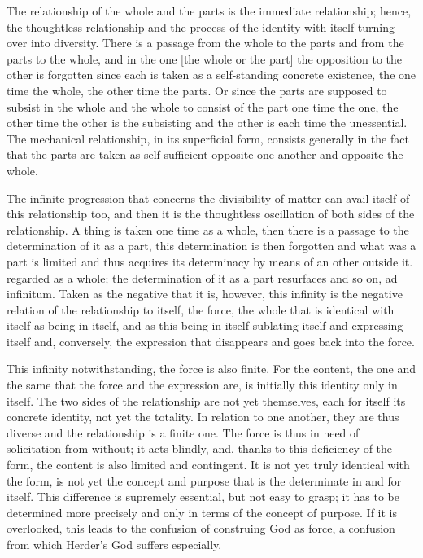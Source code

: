     The relationship of the whole and the parts is
    the immediate relationship;
    hence, the thoughtless relationship
    and the process of the identity-with-itself
    turning over into diversity.
    There is a passage from the whole to the parts and
    from the parts to the whole,
    and in the one [the whole or the part]
    the opposition to the other is forgotten since
    each is taken as a self-standing concrete existence,
    the one time the whole, the other time the parts.
    Or since the parts are supposed to subsist in the whole
    and the whole to consist of the part one time the one,
    the other time the other is the subsisting and
    the other is each time the unessential.
    The mechanical relationship,
    in its superficial form,
    consists generally in the fact
    that the parts are taken as self-sufficient
    opposite one another and opposite the whole.

    The infinite progression that concerns
    the divisibility of matter
    can avail itself of this relationship too,
    and then it is the thoughtless oscillation
    of both sides of the relationship.
    A thing is taken one time as a whole,
    then there is a passage to the determination of it as a part,
    this determination is then forgotten and
    what was a part is limited and thus acquires its determinacy
    by means of an other outside it.
    regarded as a whole;
    the determination of it as a part resurfaces and so on,
    ad infinitum.
    Taken as the negative that it is, however,
    this infinity is the negative relation of
    the relationship to itself, the force,
    the whole that is identical with itself as being-in-itself,
    and as this being-in-itself sublating itself and expressing itself
    and, conversely, the expression that disappears
    and goes back into the force.

    This infinity notwithstanding,
    the force is also finite.
    For the content, the one and the same
    that the force and the expression are, is
    initially this identity only in itself.
    The two sides of the relationship
    are not yet themselves,
    each for itself its concrete identity,
    not yet the totality.
    In relation to one another, they are thus diverse
    and the relationship is a finite one.
    The force is thus in need of solicitation from without;
    it acts blindly, and, thanks to this deficiency of the form,
    the content is also limited and contingent.
    It is not yet truly identical with the form,
    is not yet the concept and purpose
    that is the determinate in and for itself.
    This difference is supremely essential,
    but not easy to grasp;
    it has to be determined more precisely and
    only in terms of the concept of purpose.
    If it is overlooked, this leads to
    the confusion of construing God as force,
    a confusion from which Herder's God suffers especially.

